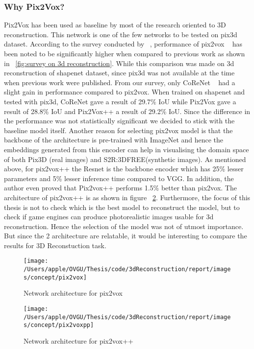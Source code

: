 \subsubsection{Why Pix2Vox?}
Pix2Vox has been used as baseline by most of the research oriented to 3D reconstruction.
This network is one of the few networks to be tested on pix3d dataset.
According to the survey conducted by ~\cite{Han2021ImageBased3O}, performance of pix2vox ~\cite{Xie_2019}
has been noted to be significantly higher when compared to previous work  as shown in ~\ref{fig:survey on 3d reconstruction}.
While this comparison was made on 3d reconstruction of shapenet dataset, since pix3d was not available at the time when previous work were published.
From our survey, only CoReNet ~\cite{popov2020corenet} had a slight gain in performance compared to pix2vox.
When trained on shapenet and tested with pix3d, CoReNet gave a result of 29.7\% IoU while Pix2Vox gave a result of 28.8\% IoU and Pix2Vox++ a result of 29.2\% IoU.
Since the difference in the performance was not statistically significant we decided to stick with the baseline model itself.
Another reason for selecting pix2vox model is that the backbone of the architecture is pre-trained with ImageNet and
hence the embeddings generated from this encoder can help in visualising the domain space of both Pix3D (real images) and S2R:3DFREE(synthetic images).
As mentioned above, for pix2vox++ the Resnet is the backbone encoder which has 25\% lesser parameters and 5\% lesser inference time compared to VGG.
In addition, the author even proved that Pix2vox++ performs 1.5\% better than pix2vox.
The architecture of pix2vox++ is as shown in figure ~\ref{fig:pix2voxpp architecture}.
Furthermore, the focus of this thesis is not to check which is the best model to reconstruct the model, but to check if game engines can produce photorealistic images usable for 3d reconstruction.
Hence the selection of the model was not of utmost importance.
But since the 2 architecture are relatable, it would be interesting to compare the results for 3D Reconstuction task.
\begin{figure}
    \centering
    \texttt{[image: /Users/apple/OVGU/Thesis/code/3dReconstruction/report/images/concept/pix2vox]}
    \caption{Network architecture for pix2vox~\cite{Xie_2019}}
    \label{fig:pix2vox architecture}
\end{figure}

\begin{figure}
    \centering
    \texttt{[image: /Users/apple/OVGU/Thesis/code/3dReconstruction/report/images/concept/pix2voxpp]}
    \caption{Network architecture for pix2vox++~\cite{Xie_2020}}
    \label{fig:pix2voxpp architecture}
\end{figure}

